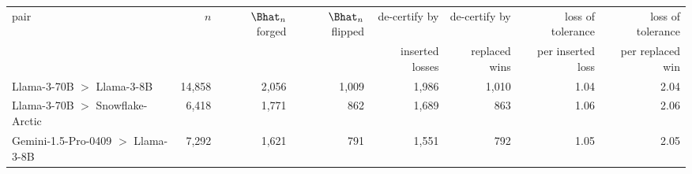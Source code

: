 \begin{tabular}{lrrrrrrr}
\toprule
pair & $n$ & $\Bhat_n$ forged & $\Bhat_n$ flipped & de-certify by & de-certify by & loss of tolerance & loss of tolerance \\
 & & & & inserted losses & replaced wins & per inserted loss & per replaced win \\
\midrule
Llama-3-70B $>$ Llama-3-8B & 14,858 & 2,056 & 1,009 & 1,986 & 1,010 & 1.04 & 2.04 \\
Llama-3-70B $>$ Snowflake-Arctic & 6,418 & 1,771 & 862 & 1,689 & 863 & 1.06 & 2.06 \\
Gemini-1.5-Pro-0409 $>$ Llama-3-8B & 7,292 & 1,621 & 791 & 1,551 & 792 & 1.05 & 2.05 \\
\bottomrule
\end{tabular}